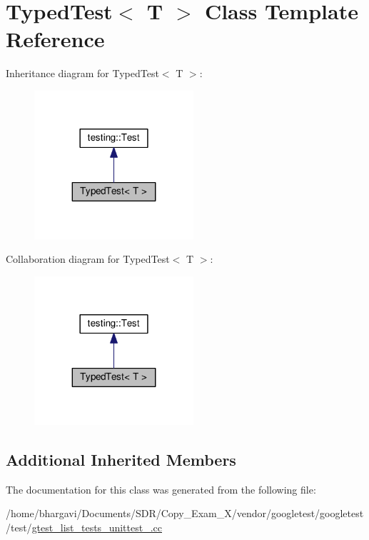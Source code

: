 \hypertarget{class_typed_test}{}\section{Typed\+Test$<$ T $>$ Class Template Reference}
\label{class_typed_test}


Inheritance diagram for Typed\+Test$<$ T $>$\+:
\nopagebreak
\begin{figure}[H]
\begin{center}
\leavevmode
\includegraphics[width=167pt]{class_typed_test__inherit__graph}
\end{center}
\end{figure}


Collaboration diagram for Typed\+Test$<$ T $>$\+:
\nopagebreak
\begin{figure}[H]
\begin{center}
\leavevmode
\includegraphics[width=167pt]{class_typed_test__coll__graph}
\end{center}
\end{figure}
\subsection*{Additional Inherited Members}


The documentation for this class was generated from the following file\+:\begin{DoxyCompactItemize}
\item 
/home/bhargavi/\+Documents/\+S\+D\+R/\+Copy\+\_\+\+Exam\+\_\+X/vendor/googletest/googletest/test/\hyperlink{gtest__list__tests__unittest___8cc}{gtest\+\_\+list\+\_\+tests\+\_\+unittest\+\_\+.\+cc}\end{DoxyCompactItemize}
